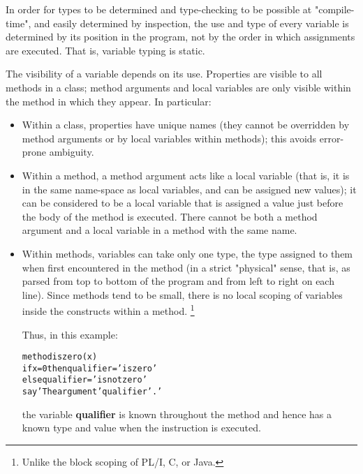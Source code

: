 In order for types to be determined and type-checking to be possible at
"compile-time", and easily determined by inspection, the use and
type of every variable is determined by its position in the program, not
by the order in which assignments are executed.
That is, variable typing is static.
 
The visibility of a variable depends on its use.  Properties are
visible to all methods in a class; method arguments and local variables
are only visible within the method in which they appear.  In particular:
\begin{itemize}
\item Within a class, properties have unique names (they cannot be
overridden by method arguments or by local variables within
methods); this avoids error-prone ambiguity.
\item 
Within a method, a method argument acts like a local variable (that is,
it is in the same name-space as local variables, and can be assigned new
values); it can be considered to be a local variable that is assigned a
value just before the body of the method is executed.  There cannot be
both a method argument and a local variable in a method with the same
name.
\item 
Within methods, variables can take only one type, the type assigned to
them when first encountered in the method (in a strict "physical"
sense, that is, as parsed from top to bottom of the program and from
left to right on each line).
Since methods tend to be small, there is no local scoping of variables
inside the constructs within a method.
\footnote{
Unlike the block scoping of PL/I, C, or Java.
}
 
Thus, in this example:
\begin{alltt}
method iszero(x)
  if x=0 then qualifier='is zero'
         else qualifier='is not zero'
  say 'The argument' qualifier'.'
\end{alltt}
the variable \textbf{qualifier} is known throughout the method and
hence has a known type and value when the  instruction is
executed.
\end{itemize}
 
